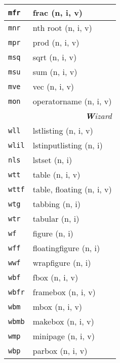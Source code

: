 \documentclass[oneside,10pt,landscape,DIV17]{scrartcl}
\newcommand{\Map}[1] {\textbf{\textasciiacute}\texttt{#1}}
\begin{document}
\begin{multicols}{3}
\begin{center}
\begin{tabular}[]{|p{11mm}|p{62mm}|}
\hline	\Map{mfr} & frac                      \hfill (n, i, v)\\
\hline	\Map{mnr} & nth root                  \hfill (n, i, v)\\
\hline	\Map{mpr} & prod                      \hfill (n, i, v)\\
\hline	\Map{msq} & sqrt                      \hfill (n, i, v)\\
\hline	\Map{msu} & sum                       \hfill (n, i, v)\\
\hline	\Map{mve} & vec                       \hfill (n, i, v)\\
\hline	\Map{mon} & operatorname              \hfill (n, i, v)\\
\hline
\hline
\multicolumn{2}{|r|}{\textsl{\textbf{W}izard}}\\[1.0ex]
\hline  \Map{wll}  & lstlisting               \hfill (n, i, v)\\
\hline  \Map{wlil} & lstinputlisting          \hfill (n, i)\\
\hline  \Map{nls}  & lstset                   \hfill (n, i)\\
\hline
\hline  \Map{wtt}  & table                    \hfill (n, i, v)\\
\hline  \Map{wttf} & table, floating          \hfill (n, i, v)\\
\hline  \Map{wtg}  & tabbing                  \hfill (n, i)\\
\hline  \Map{wtr}  & tabular                  \hfill (n, i)\\
\hline
\hline  \Map{wf}   & figure                   \hfill (n, i)\\
\hline  \Map{wff}  & floatingfigure           \hfill (n, i)\\
\hline  \Map{wwf}  & wrapfigure               \hfill (n, i)\\
\hline
\hline  \Map{wbf}  & fbox                     \hfill (n, i, v)\\
\hline  \Map{wbfr} & framebox                 \hfill (n, i, v)\\
\hline  \Map{wbm}  & mbox                     \hfill (n, i, v)\\
\hline  \Map{wbmb} & makebox                  \hfill (n, i, v)\\
\hline  \Map{wmp}  & minipage                 \hfill (n, i, v)\\
\hline  \Map{wbp}  & parbox                   \hfill (n, i, v)\\

\end{tabular}
\end{center}
\end{multicols}
\end{document}
